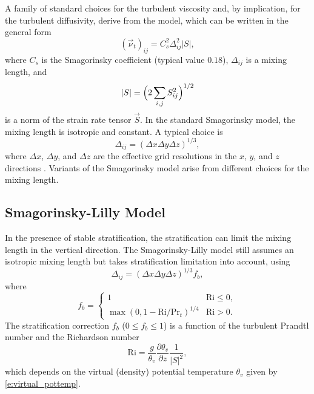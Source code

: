 \documentclass{report}
\begin{document}
A family of standard choices for the turbulent viscosity and, by implication, for the turbulent diffusivity, derive from the \citet{smagorinsky:1963} model, which can be written in the general form 
\begin{equation}
(\vec{\nu}_t)_{ij} = C_{s}^2 \Delta^{2}_{ij} |S|,   
\label{eq:eddy-viscosity_smag}
\end{equation}
where $C_{s} $ is the Smagorinsky coefficient (typical value $0.18$), $\Delta_{ij}$ is a mixing length, and 
\begin{equation}
|S| = \Bigl(2 \sum_{i,j} S_{ij}^2 \Bigr)^{1/2}
\end{equation} 
is a norm of the strain rate tensor $\vec{S}$. In the standard Smagorinsky model, the mixing length is isotropic and constant. A typical choice is 
\begin{equation}
    \Delta_{ij} = (\Delta x \Delta y \Delta z)^{1/3},
\end{equation}
where $\Delta x$, $\Delta y$, and $\Delta z$ are the effective grid resolutions in the $x$, $y$, and $z$ directions \citep{deardorff1970}. Variants of the Smagorinsky model arise from different choices for the mixing length.

\subsection{Smagorinsky-Lilly Model}

In the presence of stable stratification, the stratification can limit the mixing length  in the vertical direction. The Smagorinsky-Lilly model \citep{smagorinsky:1963, lilly:1962} still assumes an isotropic mixing length  but takes stratification limitation into account, using 
\begin{equation}\label{eq:smag-lilly}
\Delta_{ij} = (\Delta x \Delta y \Delta z)^{1/3} f_{b},   
\end{equation}
where 
\begin{equation}\label{eq:Lilly_strat}
f_{b} = 
    \begin{cases}
    1 & \mathrm{Ri} \leq 0 ,\\
    \max(0, 1 - \mathrm{Ri} / \mathrm{Pr}_{t})^{1/4} & \mathrm{Ri} > 0 .
    \end{cases}
\end{equation}
The stratification correction $f_{b}$ ($0 \leq f_b \leq 1$) is a function of the turbulent Prandtl number  and the Richardson number 
\[
\mathrm{Ri} = \frac{g}{\theta_v} \frac{\partial \theta_v}{\partial z} \frac{1}{{|S|}^2},
\]
which depends on the virtual (density) potential temperature $\theta_v$ given by \eqref{e:virtual_pottemp}.
 
\end{document}
